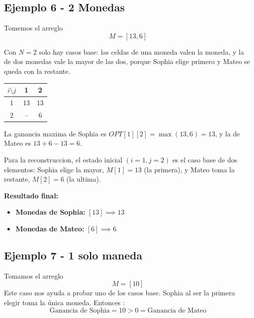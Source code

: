 \subsection{Ejemplo 6 - 2 Monedas}

Tomemos el arreglo
\[
M = [13, 6]
\]

Con $N = 2$ solo hay casos base: las celdas de una moneda valen la moneda, y la de dos monedas vale la mayor de las dos, porque Sophia elige primero y Mateo se queda con la restante.

\begin{table}[H]
\centering
\begin{tabular}{ccc}
\toprule
$i \setminus j$ & 1 & 2 \\
\midrule
1 & 13 & 13 \\
2 & -- & 6  \\
\bottomrule
\end{tabular}
\end{table}

La ganancia maxima de Sophia es $OPT[1][2] = \max(13, 6) = 13$, y la de Mateo es $13 + 6 - 13 = 6$.

Para la reconstruccion, el estado inicial $(i=1, j=2)$ es el caso base de dos elementos: Sophia elige la mayor, $M[1] = 13$ (la primera), y Mateo toma la restante, $M[2] = 6$ (la ultima).

\textbf{Resultado final:}
\begin{itemize}
    \item \textbf{Monedas de Sophia:} $[13] \implies 13$
    \item \textbf{Monedas de Mateo:} $[6] \implies 6$
\end{itemize}
\subsection{Ejemplo 7 - 1 solo maneda}

Tomamos el arreglo
\[
M = [10]
\]
Este caso nos ayuda a probar uno de los casos base. Sophia al ser la primera elegir toma la única moneda. Entonces :
\[
\text{Ganancia de Sophia} = 10 > 0 = \text{Ganancia de Mateo}
\]
\newpage
